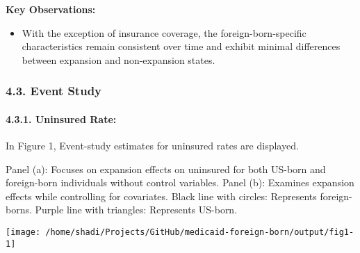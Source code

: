 \documentclass[
]{article}
\providecommand{\tightlist}{%
  \setlength{\itemsep}{0pt}\setlength{\parskip}{0pt}}
\begin{document}
\textbf{Key Observations:}

\begin{itemize}
\tightlist
\item
  With the exception of insurance coverage, the foreign-born-specific
  characteristics remain consistent over time and exhibit minimal
  differences between expansion and non-expansion states.
\end{itemize}

\hypertarget{event-study}{%
\subsubsection{4.3. Event Study}\label{event-study}}

\hypertarget{uninsured-rate}{%
\paragraph{4.3.1. Uninsured Rate:}\label{uninsured-rate}}

In Figure 1, Event-study estimates for uninsured rates are displayed.

Panel (a): Focuses on expansion effects on uninsured for both US-born
and foreign-born individuals without control variables. Panel (b):
Examines expansion effects while controlling for covariates. Black line
with circles: Represents foreign-borns. Purple line with triangles:
Represents US-born.

\begin{center}\texttt{[image: /home/shadi/Projects/GitHub/medicaid-foreign-born/output/fig1-1]} \end{center}
\end{document}

